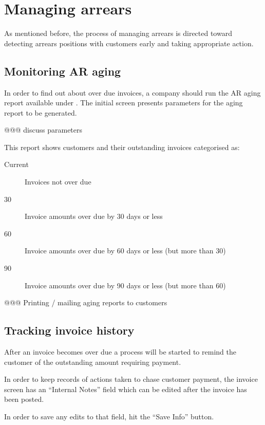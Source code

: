 \section{Managing arrears}
\label{sec-workflows-credit-risk-managing-arrears}

As mentioned before, the process of managing arrears is directed toward
detecting arrears positions with customers early and taking appropriate
action.


\subsection{Monitoring AR aging}
\label{subsec-workflows-credit-risk-monitoring-arrears}

In order to find out about over due invoices, a company should run the AR
aging report available under .
The initial screen presents parameters for the aging report to be generated.

@@@ discuss parameters

This report shows customers and their outstanding invoices categorised as:

\begin{description}
\item [Current] Invoices not over due
\item [30] Invoice amounts over due by 30 days or less
\item [60] Invoice amounts over due by 60 days or less (but more than 30)
\item [90] Invoice amounts over due by 90 days or less (but more than 60)
\end{description}


@@@ Printing / mailing aging reports to customers


\subsection{Tracking invoice history}
\label{subsec-workflows-credit-risk-arrears-reminding}

After an invoice becomes over due a process will be started to remind
the \gls{customer} of the outstanding amount requiring payment.

In order to keep records of actions taken to chase customer payment,
the invoice screen has an ``Internal Notes'' field which can be edited
after the invoice has been posted.

In order to save any edits to that field, hit the ``Save Info'' button.

